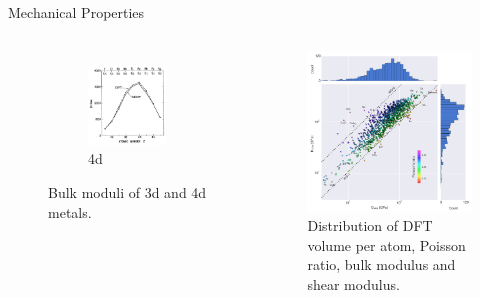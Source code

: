 \documentclass[aspectratio=169]{beamer}
\begin{document}
\begin{frame}{Mechanical Properties}
\begin{columns}
\begin{figure}
\begin{subfigure}{0.45\textwidth}
                    \includegraphics[width=\linewidth]{lectures/figures/8_4D_TM_Bulk_Moduli.png}
                    \caption{4d}
                \end{subfigure}
                \caption{Bulk moduli of 3d and 4d metals.\cite{moruzziTrendsBulkModuli1993}}
            \end{figure}


            \begin{figure}
                \centering
                \includegraphics[width=0.7\linewidth]{lectures/figures/8_MP_Elastic_Moduli.png}
                \caption{Distribution of DFT volume per atom, Poisson ratio, bulk modulus and shear modulus.\cite{dejongChartingCompleteElastic2015}}
            \end{figure}

        \end{columns}
    \end{frame}
\end{document}
